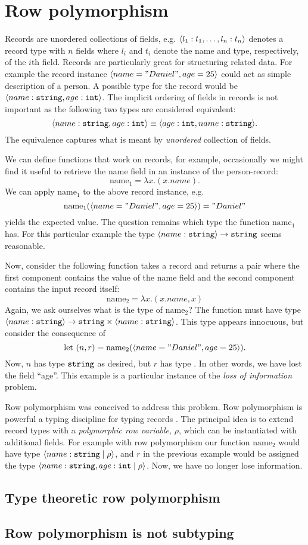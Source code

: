 \section{Row polymorphism}
Records are unordered collections of fields, e.g. $\langle l_1:t_1,\dots,l_n : t_n \rangle$ denotes a record type with $n$ fields where $l_i$ and $t_i$ denote the name and type, respectively, of the $i$th field.
Records are particularly great for structuring related data.
For example the record instance $\langle name="Daniel", age=25 \rangle$ could act as simple description of a person.
A possible type for the record would be $\langle name : \texttt{string}, age : \texttt{int} \rangle$.
The implicit ordering of fields in records is not important as the following two types are considered equivalent:
\[ \langle name : \texttt{string}, age : \texttt{int} \rangle \equiv \langle age : \texttt{int}, name : \texttt{string} \rangle. \]
The equivalence captures what is meant by \emph{unordered} collection of fields.

We can define functions that work on records, for example, occasionally we might find it useful to retrieve the name field in an instance of the person-record:
\[ \text{name}_1 = \lambda x . (x.name). \]
We can apply $\text{name}_1$ to the above record instance, e.g. 
\[ \text{name}_1(\langle name="Daniel", age=25 \rangle) = "Daniel" \] 
yields the expected value.
The question remains which type the function $\text{name}_1$ has.
For this particular example the type $\langle name : \texttt{string} \rangle \to \texttt{string}$ seems reasonable.

Now, consider the following function takes a record and returns a pair where the first component contains the value of the name field and the second component contains the input record itself:
\[ \text{name}_2 = \lambda x . (x.name, x) \]
Again, we ask ourselves what is the type of $\text{name}_2$?
The function must have type $\langle name : \texttt{string} \rangle \to \texttt{string} \times \langle name : \texttt{string} \rangle$.
This type appears innocuous, but consider the consequence of
\[ \text{let }(n, r) = \text{name}_2(\langle name="Daniel", age=25 \rangle). \]
Now, $n$ has type $\texttt{string}$ as desired, but $r$ has type .
In other words, we have lost the field ``age''.
This example is a particular instance of the \emph{loss of information} problem.

Row polymorphism was conceived to address this problem. 
Row polymorphism is powerful a typing discipline for typing records \cite{Remy1993}.
The principal idea is to extend record types with a \emph{polymorphic row variable}, $\rho$, which can be instantiated with additional fields.
For example with row polymorphism our function $\text{name}_2$ would have type $\langle name : \texttt{string} \; | \; \rho  \rangle$, and $r$ in the previous example would be assigned the type $\langle name : \texttt{string}, age : \texttt{int} \; | \; \rho  \rangle$.
Now, we have no longer lose information.

\subsection{Type theoretic row polymorphism}
\subsection{Row polymorphism is not subtyping}